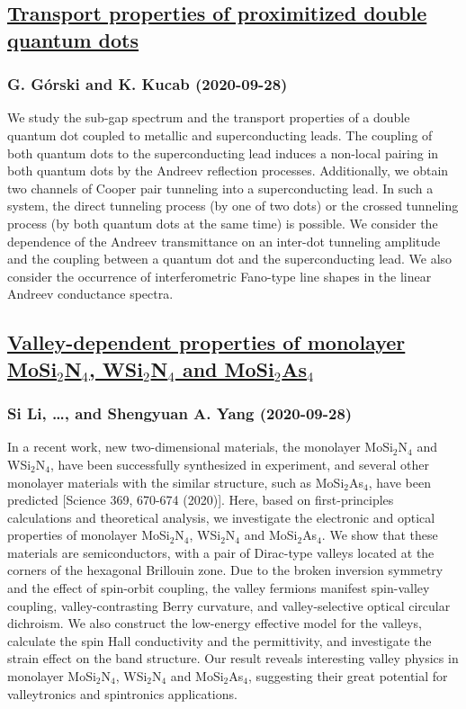 \subsection*{\href{http://arxiv.org/abs/2009.13259v1}{Transport properties of proximitized double quantum dots}}
\subsubsection*{G. Górski and K. Kucab (2020-09-28)}
We study the sub-gap spectrum and the transport properties of a double
quantum dot coupled to metallic and superconducting leads. The coupling of both
quantum dots to the superconducting lead induces a non-local pairing in both
quantum dots by the Andreev reflection processes. Additionally, we obtain two
channels of Cooper pair tunneling into a superconducting lead. In such a
system, the direct tunneling process (by one of two dots) or the crossed
tunneling process (by both quantum dots at the same time) is possible. We
consider the dependence of the Andreev transmittance on an inter-dot tunneling
amplitude and the coupling between a quantum dot and the superconducting lead.
We also consider the occurrence of interferometric Fano-type line shapes in the
linear Andreev conductance spectra.

\subsection*{\href{http://arxiv.org/abs/2009.13253v1}{Valley-dependent properties of monolayer MoSi$_{2}$N$_{4}$,  WSi$_{2}$N$_{4}$ and MoSi$_{2}$As$_{4}$}}
\subsubsection*{Si Li, \dots, and Shengyuan A. Yang (2020-09-28)}
In a recent work, new two-dimensional materials, the monolayer
MoSi$_{2}$N$_{4}$ and WSi$_{2}$N$_{4}$, have been successfully synthesized in
experiment, and several other monolayer materials with the similar structure,
such as MoSi$_{2}$As$_{4}$, have been predicted [{\color{blue}Science 369,
670-674 (2020)}]. Here, based on first-principles calculations and theoretical
analysis, we investigate the electronic and optical properties of monolayer
MoSi$_{2}$N$_{4}$, WSi$_{2}$N$_{4}$ and MoSi$_{2}$As$_{4}$. We show that these
materials are semiconductors, with a pair of Dirac-type valleys located at the
corners of the hexagonal Brillouin zone. Due to the broken inversion symmetry
and the effect of spin-orbit coupling, the valley fermions manifest spin-valley
coupling, valley-contrasting Berry curvature, and valley-selective optical
circular dichroism. We also construct the low-energy effective model for the
valleys, calculate the spin Hall conductivity and the permittivity, and
investigate the strain effect on the band structure. Our result reveals
interesting valley physics in monolayer MoSi$_{2}$N$_{4}$, WSi$_{2}$N$_{4}$ and
MoSi$_{2}$As$_{4}$, suggesting their great potential for valleytronics and
spintronics applications.

